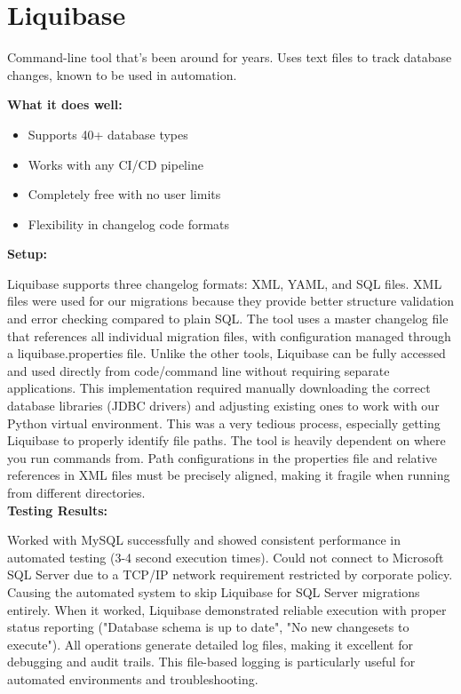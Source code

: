 \documentclass[11pt,a4paper]{article}
\begin{document}
\section{Liquibase}

Command-line tool that's been around for years. Uses text files to track database changes, known to be used in automation.

\textbf{What it does well:}
\begin{itemize}
    \item Supports 40+ database types
    \item Works with any CI/CD pipeline
    \item Completely free with no user limits
    \item Flexibility in changelog code formats
\end{itemize}

\textbf{Setup:}

Liquibase supports three changelog formats: XML, YAML, and SQL files.
XML files were used for our migrations because they provide better structure validation and error checking compared to plain SQL.
The tool uses a master changelog file that references all individual migration files, with configuration managed through a liquibase.properties file. 
Unlike the other tools, Liquibase can be fully accessed and used directly from code/command line without requiring separate applications.
This implementation required manually downloading the correct database libraries (JDBC drivers) and adjusting existing ones to work with our Python virtual environment.
This was a very tedious process, especially getting Liquibase to properly identify file paths.
The tool is heavily dependent on where you run commands from.
Path configurations in the properties file and relative references in XML files must be precisely aligned, making it fragile when running from different directories.\\

\textbf{Testing Results:}

Worked with MySQL successfully and showed consistent performance in automated testing (3-4 second execution times).
Could not connect to Microsoft SQL Server due to a TCP/IP network requirement restricted by corporate policy. 
Causing the automated system to skip Liquibase for SQL Server migrations entirely.
When it worked, Liquibase demonstrated reliable execution with proper status reporting ("Database schema is up to date", "No new changesets to execute").
All operations generate detailed log files, making it excellent for debugging and audit trails.
This file-based logging is particularly useful for automated environments and troubleshooting.\\
\end{document}
